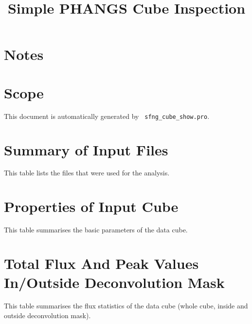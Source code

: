 \documentclass[11pt]{article}
\begin{document}
\title{Simple PHANGS Cube Inspection}

\maketitle


\section{Notes}
\label{sect:notes}


\section{Scope}
\label{sec:scope}

\noindent This document is automatically generated by {\tt
  sfng\_cube\_show.pro}.

\section{Summary of Input Files}
\label{sect:input_cube}
\noindent This table lists the files that were used for the analysis.


\section{Properties of Input Cube}
\label{sect:input_cube}
\noindent This table summarises the basic parameters of the data cube.


\section{Total Flux And Peak Values In/Outside Deconvolution Mask}
\label{sect:totflux}
\noindent  This table summarises the flux statistics of the data cube (whole cube, inside and outside deconvolution mask).

\end{document}
